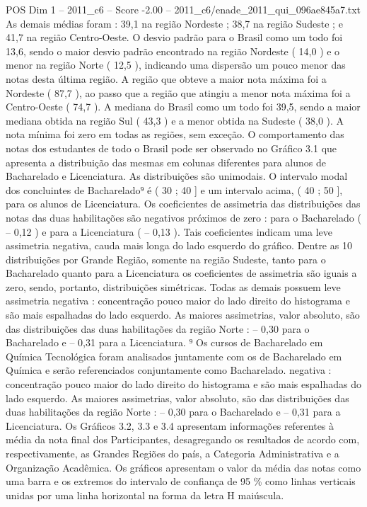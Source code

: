 \begin{textsample}{POS Dim 1 – 2011\_c6 – Score -2.00 – 2011\_c6/enade\_2011\_qui\_096ae845a7.txt}
As demais médias foram : 39,1 na região Nordeste ; 38,7 na região Sudeste ; e 41,7 na região Centro-Oeste.
O desvio padrão para o Brasil como um todo foi 13,6, sendo o maior desvio padrão encontrado na região Nordeste ( 14,0 ) e o menor na região Norte ( 12,5 ), indicando uma dispersão um pouco menor das notas desta última região.
A região que obteve a maior nota máxima foi a Nordeste ( 87,7 ), ao passo que a região que atingiu a menor nota máxima foi a Centro-Oeste ( 74,7 ).
A mediana do Brasil como um todo foi 39,5, sendo a maior mediana obtida na região Sul ( 43,3 ) e a menor obtida na Sudeste ( 38,0 ).
A nota mínima foi zero em todas as regiões, sem exceção.
O comportamento das notas dos estudantes de todo o Brasil pode ser observado no Gráfico 3.1 que apresenta a distribuição das mesmas em colunas diferentes para alunos de Bacharelado e Licenciatura.
As distribuições são unimodais.
O intervalo modal dos concluintes de Bacharelado⁹ é ( 30 ; 40 ] e um intervalo acima, ( 40 ; 50 ], para os alunos de Licenciatura.
Os coeficientes de assimetria das distribuições das notas das duas habilitações são negativos próximos de zero : para o Bacharelado ( – 0,12 ) e para a Licenciatura ( – 0,13 ).
Tais coeficientes indicam uma leve assimetria negativa, cauda mais longa do lado esquerdo do gráfico.
Dentre as 10 distribuições por Grande Região, somente na região Sudeste, tanto para o Bacharelado quanto para a Licenciatura os coeficientes de assimetria são iguais a zero, sendo, portanto, distribuições simétricas.
Todas as demais possuem leve assimetria negativa : concentração pouco maior do lado direito do histograma e são mais espalhadas do lado esquerdo.
As maiores assimetrias, valor absoluto, são das distribuições das duas habilitações da região Norte : – 0,30 para o Bacharelado e – 0,31 para a Licenciatura. ⁹ Os cursos de Bacharelado em Química Tecnológica foram analisados juntamente com os de Bacharelado em Química e serão referenciados conjuntamente como Bacharelado. negativa : concentração pouco maior do lado direito do histograma e são mais espalhadas do lado esquerdo.
As maiores assimetrias, valor absoluto, são das distribuições das duas habilitações da região Norte : – 0,30 para o Bacharelado e – 0,31 para a Licenciatura.
Os Gráficos 3.2, 3.3 e 3.4 apresentam informações referentes à média da nota final dos Participantes, desagregando os resultados de acordo com, respectivamente, as Grandes Regiões do país, a Categoria Administrativa e a Organização Acadêmica.
Os gráficos apresentam o valor da média das notas como uma barra e os extremos do intervalo de confiança de 95 \% como linhas verticais unidas por uma linha horizontal na forma da letra H maiúscula.

\end{textsample}
